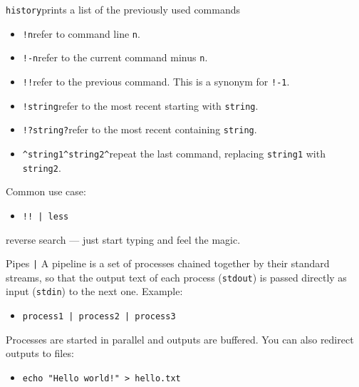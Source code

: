 \documentclass[10pt, aspectratio=169]{beamer}
\let\cmd=\lstinline
\begin{document}
\begin{frame}
  \vfill
  {\Large\cmd{history}\quad prints a list of the previously used commands}
  \vfill
  \begin{itemize}
       \item \cmd{!n}\quad refer to command line \cmd{n}.
       \item \cmd{!-n}\quad refer to the current command minus \cmd{n}.
       \item \cmd{!!}\quad refer to the previous command.  This is a synonym for \cmd{!-1}.
       \item \cmd{!string}\quad refer to the most recent starting with \cmd{string}.
       \item \cmd{!?string?}\quad refer to the most recent containing \cmd{string}.
       \item \cmd{^string1^string2^}\quad repeat the last command, replacing \cmd{string1} with \cmd{string2}.
  \end{itemize}
  \vfill
  Common use case:
  \vfill
  \begin{itemize}
    \item \cmd{!! | less}
  \end{itemize}
  \vfill
  \Large{\quad reverse search --- just start typing and feel the magic.}
  \vfill
\end{frame}

{
  \begin{frame}[plain]
  \end{frame}
}

\begin{frame}
  \vfill
  {\huge Pipes \cmd{|}}\large
  \vfill
  A pipeline is a set of processes chained together by their standard streams, so that the output text of each process (\cmd{stdout}) is passed directly as input (\cmd{stdin}) to the next one.
  \vfill
  Example:
  \vfill
  \begin{itemize}
    \item \cmd{process1 | process2 | process3}
  \end{itemize}
  \vfill
  Processes are started in parallel and outputs are buffered.
  \vfill
  You can also redirect outputs to files:
  \vfill
  \begin{itemize}
    \item \cmd{echo "Hello world!" > hello.txt}
  \end{itemize}
  \vfill
\end{frame}
\end{document}
